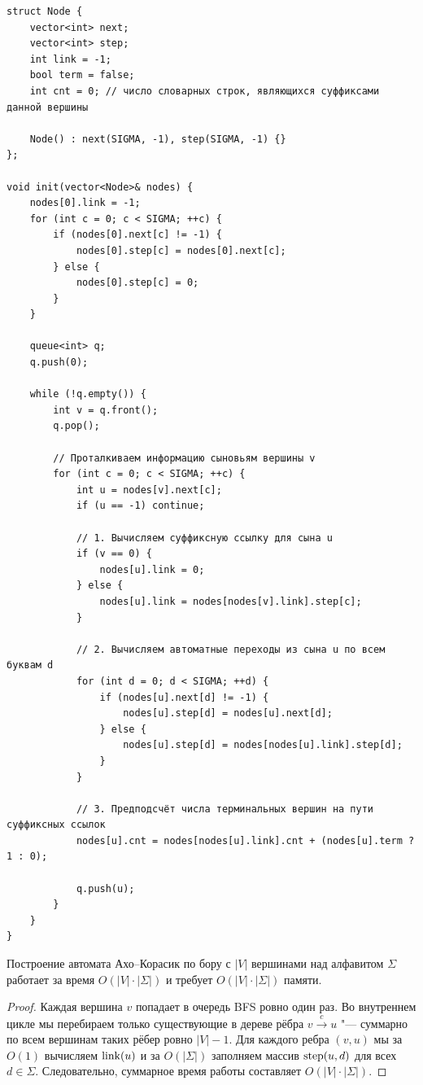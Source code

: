 \begin{lstlisting}[caption={Построение автомата Ахо--Корасик обходом в ширину}]
struct Node {
    vector<int> next;
    vector<int> step;
    int link = -1;
    bool term = false;
    int cnt = 0; // число словарных строк, являющихся суффиксами данной вершины

    Node() : next(SIGMA, -1), step(SIGMA, -1) {}
};

void init(vector<Node>& nodes) {
    nodes[0].link = -1;
    for (int c = 0; c < SIGMA; ++c) {
        if (nodes[0].next[c] != -1) {
            nodes[0].step[c] = nodes[0].next[c];
        } else {
            nodes[0].step[c] = 0;
        }
    }

    queue<int> q;
    q.push(0);

    while (!q.empty()) {
        int v = q.front();
        q.pop();

        // Проталкиваем информацию сыновьям вершины v
        for (int c = 0; c < SIGMA; ++c) {
            int u = nodes[v].next[c];
            if (u == -1) continue;

            // 1. Вычисляем суффиксную ссылку для сына u
            if (v == 0) {
                nodes[u].link = 0;
            } else {
                nodes[u].link = nodes[nodes[v].link].step[c];
            }

            // 2. Вычисляем автоматные переходы из сына u по всем буквам d
            for (int d = 0; d < SIGMA; ++d) {
                if (nodes[u].next[d] != -1) {
                    nodes[u].step[d] = nodes[u].next[d];
                } else {
                    nodes[u].step[d] = nodes[nodes[u].link].step[d];
                }
            }

            // 3. Предподсчёт числа терминальных вершин на пути суффиксных ссылок
            nodes[u].cnt = nodes[nodes[u].link].cnt + (nodes[u].term ? 1 : 0);

            q.push(u);
        }
    }
}
\end{lstlisting}

\begin{theorem}
    Построение автомата Ахо--Корасик по бору с $|V|$ вершинами над алфавитом $\Sigma$ работает за время $O(|V| \cdot |\Sigma|)$ и требует $O(|V| \cdot |\Sigma|)$ памяти.
\end{theorem}

\begin{proof}
    Каждая вершина $v$ попадает в очередь BFS ровно один раз. Во внутреннем цикле мы перебираем только существующие в дереве рёбра $v \xrightarrow{c} u$ "--- суммарно по всем вершинам таких рёбер ровно $|V| - 1$. Для каждого ребра $(v, u)$ мы за $O(1)$ вычисляем $\operatorname{link}(u)$ и за $O(|\Sigma|)$ заполняем массив $\operatorname{step}(u, d)$ для всех $d \in \Sigma$. Следовательно, суммарное время работы составляет $O(|V| \cdot |\Sigma|)$.
\end{proof}

